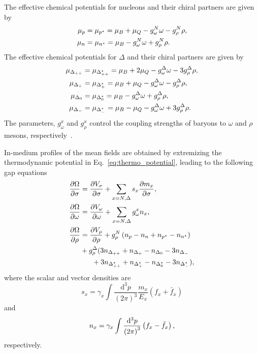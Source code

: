 \documentclass[preprint,showkeys,lengthcheck,nofootinbib,twocolumn,notitlepage,floatfix,superscriptaddress]{revtex4-1}
\begin{document}
The effective chemical potentials for nucleons and their chiral partners are given by
\begin{subequations}\label{eq:eff_chem_pot_N}
\begin{align}
	\mu_{p} &= \mu_{p^\star} = \mu_B + \mu_Q - g_\omega^N\omega - g_\rho^N\rho\rm,\\
	\mu_{n} &= \mu_{n^\star} = \mu_B - g_\omega^N\omega + g_\rho^N\rho\rm.
\end{align}
\end{subequations}
The effective chemical potentials for $\Delta$ and their chiral partners are given by
\begin{subequations}\label{eq:eff_chem_pot_D}
\begin{align}
	\mu_{\Delta_{++}} &= \mu_{\Delta^\star_{++}} = \mu_B + 2\mu_Q - g_\omega^\Delta\omega - 3g_\rho^\Delta\rho \rm,\\
	\mu_{\Delta_{+}} &= \mu_{\Delta^\star_{+}}  = \mu_B + \mu_Q - g_\omega^\Delta\omega - g_\rho^\Delta\rho\rm,\\
	\mu_{\Delta_{0}} &= \mu_{\Delta^\star_{0}}  = \mu_B - g_\omega^\Delta\omega + g_\rho^\Delta\rho\rm,\\
	\mu_{\Delta_{-}} &= \mu_{\Delta^\star_{-}}  = \mu_B -\mu_Q - g_\omega^\Delta\omega + 3g_\rho^\Delta\rho\rm.
\end{align}
\end{subequations}
The parameters, $g_\omega^x$ and $g_\rho^x$ control the coupling strengths of baryons to $\omega$ and $\rho$ mesons, respectively~\cite{Takeda:2017mrm}.

In-medium profiles of the mean fields are obtained by extremizing the thermodynamic potential in Eq.~\eqref{eq:thermo_potential}, leading to the following gap equations
\begin{subequations}
\begin{align}\label{eq:gap_eqs}
	\frac{\partial \Omega}{\partial \sigma} &= \frac{\partial V_\sigma}{\partial \sigma} + \sum_{x=N,\Delta}s_x \frac{\partial m_x}{\partial \sigma}\textrm,\\
	\frac{\partial \Omega}{\partial \omega} &= \frac{\partial V_\omega}{\partial \omega} + \sum_{x=N,\Delta}g^x_\omega n_x \textrm,\\
	\frac{\partial \Omega}{\partial \rho}   &= \frac{\partial V_\rho}{\partial \rho} + g^N_\rho \left(n_p - n_n + n_{p^\star} - n_{n^\star} \right) \\
	&+g_\rho^\Delta(3n_{\Delta_{++}}+n_{\Delta_+} -n_{\Delta_0} - 3n_{\Delta_-}\nonumber\\
	&\phantom{\;\;\;\;\;\;}+3n_{\Delta^\star_{++}}+n_{\Delta^\star_+} -n_{\Delta^\star_0} - 3n_{\Delta^\star_-})\rm,\nonumber
\end{align}
\end{subequations}
where the scalar and vector densities are
\begin{equation}
	s_x = \gamma_x \int \frac{\mathrm{d}^3 p}{\left(2\pi\right)^3} \frac{m_x}{E_x}\left(f_x + \bar f_x\right)
\end{equation}
and
\begin{equation}\label{eq:vec_dens}
	n_x = \gamma_x \int \frac{\mathrm{d}^3 p}{\left(2\pi\right)^3}\left(f_x - \bar f_x\right) \textrm,
\end{equation}
respectively.
\end{document}

